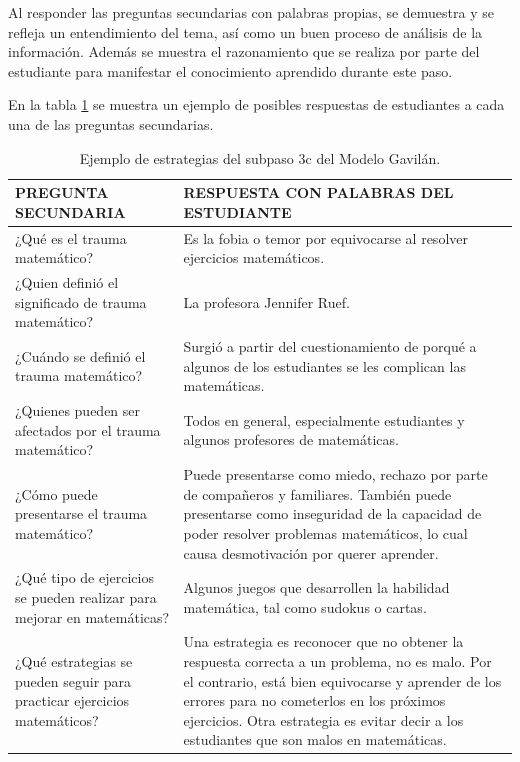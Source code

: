 Al responder las preguntas secundarias con palabras propias, se demuestra y se refleja un entendimiento del tema, así como un buen proceso de análisis de la información. Además se muestra el razonamiento que se realiza por parte del estudiante para manifestar el conocimiento aprendido durante este paso.

En la tabla \ref{tab:t7} se muestra un ejemplo de posibles respuestas de estudiantes a cada una de las preguntas secundarias.

\begin{table}[t]
  \begin{center}
    \begin{tabular}{ | p{8cm} | p{8cm} | }
      \hline
      PREGUNTA SECUNDARIA & RESPUESTA CON PALABRAS DEL ESTUDIANTE \\ \hline
      ¿Qué es el trauma matemático? & Es la fobia o temor por equivocarse al resolver ejercicios matemáticos. \\ \hline
      ¿Quien definió el significado de trauma matemático? & La profesora Jennifer Ruef. \\ \hline
      ¿Cuándo se definió el trauma matemático? & Surgió a partir del cuestionamiento de porqué a algunos de los estudiantes se les complican las matemáticas. \\ \hline
      ¿Quienes pueden ser afectados por el trauma matemático? & Todos en general, especialmente estudiantes y algunos profesores de matemáticas. \\ \hline
      ¿Cómo puede presentarse el trauma matemático? & Puede presentarse como miedo, rechazo por parte de compañeros y familiares. También puede presentarse como inseguridad de la capacidad de poder resolver problemas matemáticos, lo cual causa desmotivación por querer aprender. \\ \hline
      ¿Qué tipo de ejercicios se pueden realizar para mejorar en matemáticas? & Algunos juegos que desarrollen la habilidad matemática, tal como sudokus o cartas. \\ \hline
      ¿Qué estrategias se pueden seguir para practicar ejercicios matemáticos? & Una estrategia es reconocer  que no obtener la respuesta correcta a un problema, no es malo. Por el contrario, está bien equivocarse y aprender de los errores para no cometerlos en los próximos ejercicios. Otra estrategia es evitar decir a los estudiantes que son malos en matemáticas.
       \\ \hline
    \end{tabular}
    \caption{Ejemplo de estrategias del subpaso 3c del Modelo Gavilán.}
    \label{tab:t7}
  \end{center}
\end{table}

